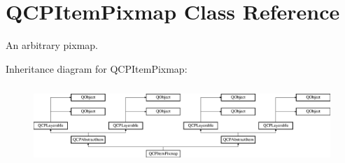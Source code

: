 \hypertarget{class_q_c_p_item_pixmap}{}\section{Q\+C\+P\+Item\+Pixmap Class Reference}
\label{class_q_c_p_item_pixmap}


An arbitrary pixmap.  


Inheritance diagram for Q\+C\+P\+Item\+Pixmap\+:\begin{figure}[H]
\begin{center}
\leavevmode
\includegraphics[height=3.017241cm]{class_q_c_p_item_pixmap}
\end{center}
\end{figure}
